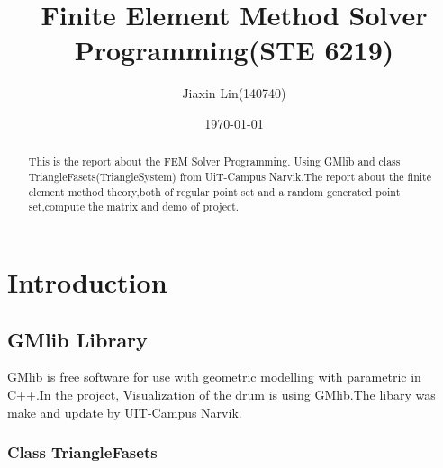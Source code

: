 \documentclass[a4,10pt]{article}
\title{Finite Element Method Solver Programming(STE 6219)}
\author{Jiaxin Lin(140740)}
\date{\today}
\begin{document}
  \maketitle

  \begin{abstract}
   This is the report about the FEM Solver Programming.
   Using GMlib and class TriangleFasets(TriangleSystem) from UiT-Campus Narvik.The report about the finite element method theory,both of regular point set and a random generated point set,compute the matrix and demo of project.
   
  \end{abstract}


 
  \section{Introduction}
\vspace{10pt}
 \subsection*{GMlib Library}
 \vspace{10pt}
GMlib is free software for use with geometric modelling with parametric in C++.In the project,
Visualization of the drum is using GMlib.The libary was make and update by UIT-Campus Narvik.

   \subsubsection*{Class TriangleFasets}
\end{document}
